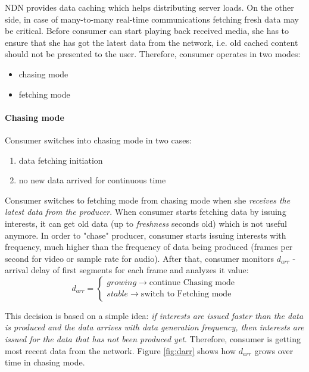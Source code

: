 \documentclass[10pt]{proc}
\begin{document}
NDN provides data caching which helps distributing server loads. On the other side, in case of many-to-many real-time communications fetching fresh data may be critical. 
Before consumer can start playing back received media, she has to ensure that she has got the latest data from the network, i.e. old cached content should not be presented to the user. Therefore, consumer operates in two modes: 
\begin{itemize}
\item chasing mode 
\item fetching mode
\end{itemize}

\paragraph{Chasing mode}
Consumer switches into chasing mode in two cases:
\begin{enumerate}
\item data fetching initiation
\item no new data arrived for continuous time
\end{enumerate}

Consumer switches to fetching mode from chasing mode when she \textit{receives the latest data from the producer}. When consumer starts fetching data by issuing interests, it can get old data (up to \textit{freshness} seconds old) which is not useful anymore. In order to "chase" producer, consumer starts issuing interests with frequency, much higher than the frequency of data being produced (frames per second for video or sample rate for audio). After that, consumer monitors $d_{arr}$ - arrival delay of first segments for each frame and analyzes it value:
\begin{equation}
d_{arr} = \left\{\begin{matrix}
growing \rightarrow \mbox{continue Chasing mode}\\ 
stable \rightarrow \mbox{switch to Fetching mode}
\end{matrix}\right.
\end{equation}

This decision is based on a simple idea: \textit{if interests are issued faster than the data is produced and the data arrives with data generation frequency, then interests are issued for the data that has not been produced yet}. Therefore, consumer is getting most recent data from the network. Figure \ref{fig:darr} shows how $d_{arr}$ grows over time in chasing mode.
\end{document}
